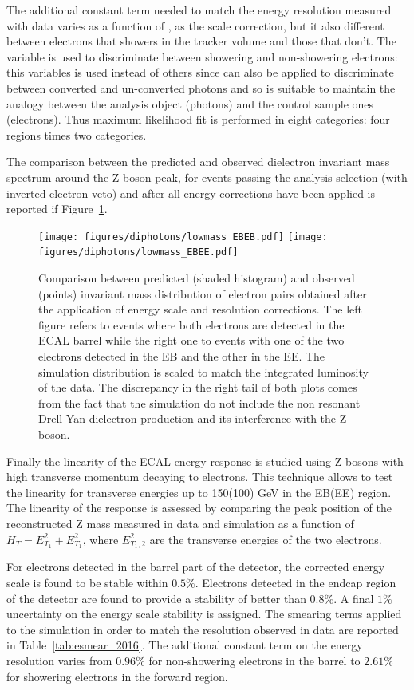 The additional constant term needed to match the energy resolution measured with data varies as a function
of \scEta, as the scale correction, but it also different between electrons that showers in the tracker volume
and those that don't.
The \rnine variable is used to discriminate between showering and non-showering electrons: this variables is used
instead of others since can also be applied to discriminate between converted and un-converted photons and
so is suitable to maintain the analogy between the analysis object (photons) and the control sample ones (electrons).
Thus maximum likelihood fit is performed in eight categories: four \scEta regions times two \rnine categories.

The comparison between the predicted and observed dielectron invariant mass spectrum around the Z boson peak,
for events passing the analysis selection (with inverted electron veto) and after all energy corrections have been applied
is reported if Figure~\ref{z_peaks}.

\begin{figure}[!h]
  \centering
  \texttt{[image: figures/diphotons/lowmass\_EBEB.pdf]}
  \texttt{[image: figures/diphotons/lowmass\_EBEE.pdf]}
  \caption{Comparison between predicted (shaded histogram) and observed (points) invariant mass distribution
    of electron pairs obtained after the application of energy scale and resolution corrections.
    The left figure refers to events where both electrons are detected in the ECAL barrel while the right one
    to events with one of the two electrons detected in the EB and the other in the EE.
    The simulation distribution is scaled to match the integrated luminosity of the data.
    The discrepancy in the right tail of both plots comes from the fact that the simulation do not include
  the non resonant Drell-Yan dielectron production and its interference with the Z boson.}
  \label{z_peaks}
\end{figure}  

Finally the linearity of the ECAL energy response is studied using Z bosons with high transverse momentum
decaying to electrons. This technique allows to test the linearity for transverse energies up to 150(100) GeV in
the EB(EE) region.
The linearity of the response is assessed by comparing the peak position of the
reconstructed Z mass measured in data and simulation as a function of $H_T = E_{T_1}^2 + E_{T_1}^2$, where
$E_{T_1,2}^2$ are the transverse energies of the two electrons.

For electrons detected in the barrel part of the detector, the corrected energy scale
is found to be stable within $0.5\%$. Electrons detected in the endcap region of the
detector are found to provide a stability of better than $0.8\%$.
A final $1\%$ uncertainty on the energy scale stability is assigned.
The smearing terms applied to the simulation in order to match the resolution observed in data are reported in
Table~\ref{tab:esmear_2016}. The additional constant term on the energy resolution varies from $0.96\%$ for
non-showering electrons in the barrel to $2.61\%$ for showering electrons in the forward region.

